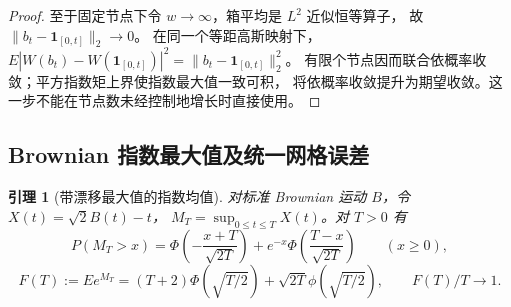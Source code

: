 \documentclass[UTF8,a4paper,11pt,fontset=fandol]{ctexart}
\newtheorem{lemma}{引理}[section]
\theoremstyle{remark}
\begin{document}
\begin{proof}
至于固定节点下令 $w\to\infty$，箱平均是 $L^2$ 近似恒等算子，
故 $\|b_t-\mathbf1_{[0,t]}\|_2\to0$。
在同一个等距高斯映射下，
$E|W(b_t)-W(\mathbf1_{[0,t]})|^2=\|b_t-\mathbf1_{[0,t]}\|_2^2$。
有限个节点因而联合依概率收敛；平方指数矩上界使指数最大值一致可积，
将依概率收敛提升为期望收敛。这一步不能在节点数未经控制地增长时直接使用。

\end{proof}

\subsection{Brownian 指数最大值及统一网格误差}
\begin{lemma}[带漂移最大值的指数均值]\label{lem:paperbrownian}
对标准 Brownian 运动 $B$，令 $X(t)=\sqrt2B(t)-t$，
$M_T=\sup_{0\le t\le T}X(t)$。对 $T>0$ 有
\[
 P(M_T>x)=\Phi\!\left(-\frac{x+T}{\sqrt{2T}}\right)
 +e^{-x}\Phi\!\left(\frac{T-x}{\sqrt{2T}}\right)\qquad(x\ge0),
\]
\[
 F(T):=Ee^{M_T}=(T+2)\Phi(\sqrt{T/2})
 +\sqrt{2T}\phi(\sqrt{T/2}),\qquad F(T)/T\longrightarrow1.
\]
\end{lemma}
\end{document}
